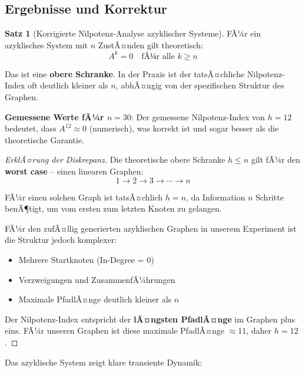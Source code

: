 ﻿\documentclass[a4paper,12pt]{report}
\theoremstyle{definition}
\newtheorem{satz}{Satz}
\begin{document}
	\subsection{Ergebnisse und Korrektur}
	
	\begin{satz}[Korrigierte Nilpotenz-Analyse azyklischer Systeme]
		FÃ¼r ein azyklisches System mit $n$ ZustÃ¤nden gilt theoretisch:
		\[
		A^k = 0 \quad \text{fÃ¼r alle } k \geq n
		\]
		
		Das ist eine \textbf{obere Schranke}. In der Praxis ist der tatsÃ¤chliche Nilpotenz-Index oft deutlich kleiner als $n$, abhÃ¤ngig von der spezifischen Struktur des Graphen.
		
		\textbf{Gemessene Werte fÃ¼r $n = 30$}:
		Der gemessene Nilpotenz-Index von $h = 12$ bedeutet, dass $A^{12} \approx 0$ (numerisch), was korrekt ist und sogar besser als die theoretische Garantie.
	\end{satz}
	
	\begin{proof}[ErklÃ¤rung der Diskrepanz]
		Die theoretische obere Schranke $h \leq n$ gilt fÃ¼r den \textbf{worst case} -- einen linearen Graphen:
		\[
		1 \to 2 \to 3 \to \cdots \to n
		\]
		
		FÃ¼r einen solchen Graph ist tatsÃ¤chlich $h = n$, da Information $n$ Schritte benÃ¶tigt, um vom ersten zum letzten Knoten zu gelangen.
		
		FÃ¼r den zufÃ¤llig generierten azyklischen Graphen in unserem Experiment ist die Struktur jedoch komplexer:
		\begin{itemize}
			\item Mehrere Startknoten (In-Degree = 0)
			\item Verzweigungen und ZusammenfÃ¼hrungen
			\item Maximale PfadlÃ¤nge deutlich kleiner als $n$
		\end{itemize}
		
		Der Nilpotenz-Index entspricht der \textbf{lÃ¤ngsten PfadlÃ¤nge} im Graphen plus eins. FÃ¼r unseren Graphen ist diese maximale PfadlÃ¤nge $\approx 11$, daher $h = 12$.
	\end{proof}
	
	Das azyklische System zeigt klare transiente Dynamik:
	
\end{document}
